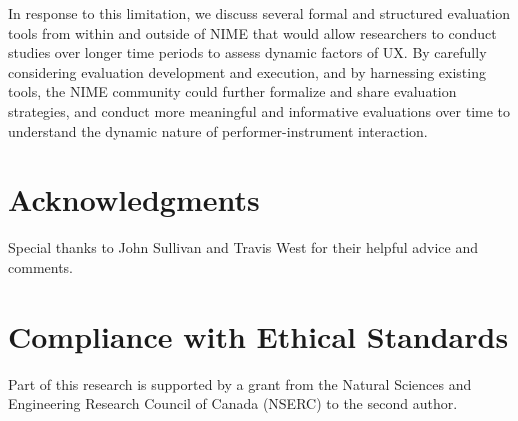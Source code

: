 \documentclass[sigconf]{nimeart}
\begin{document}
In response to this limitation, we discuss several formal and structured evaluation tools from within and outside of NIME that would allow researchers to conduct studies over longer time periods to assess dynamic factors of UX. By carefully considering evaluation development and execution, and by harnessing existing tools, the NIME community could further formalize and share evaluation strategies, and conduct more meaningful and informative evaluations over time to understand the dynamic nature of performer-instrument interaction.~

\section{Acknowledgments}\label{acknowledgments}

Special thanks to John Sullivan and Travis West for their helpful advice and comments.

\section{Compliance with Ethical Standards}\label{compliance-with-ethical-standards}

Part of this research is supported by a grant from the Natural Sciences and Engineering Research Council of Canada (NSERC) to the second author.
\end{document}
